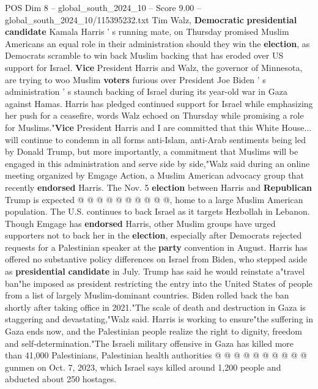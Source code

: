 \begin{textsample}{POS Dim 8 – global\_south\_2024\_10 – Score 9.00 – global\_south\_2024\_10/115395232.txt}  \label{ex:f8_pos_266}
Tim Walz, \textbf{Democratic} \textbf{presidential} \textbf{candidate} Kamala Harris ' s running mate, on Thursday promised Muslim Americans an equal role in their administration should they win the \textbf{election}, as Democrats scramble to win back Muslim backing that has eroded over US support for Israel. \textbf{Vice} President Harris and Walz, the governor of Minnesota, are trying to woo Muslim \textbf{voters} furious over President Joe Biden ' s administration ' s staunch backing of Israel during its year-old war in Gaza against Hamas.
Harris has pledged continued support for Israel while emphasizing her push for a ceasefire, words Walz echoed on Thursday while promising a role for Muslims."\textbf{Vice} President Harris and I are committed that this White House... will continue to condemn in all forms anti-Islam, anti-Arab sentiments being led by Donald Trump, but more importantly, a commitment that Muslims will be engaged in this administration and serve side by side,"Walz said during an online meeting organized by Emgage Action, a Muslim American advocacy group that recently \textbf{endorsed} Harris.
The Nov. 5 \textbf{election} between Harris and \textbf{Republican} Trump is expected @ @ @ @ @ @ @ @ @ @, home to a large Muslim American population.
The U.S. continues to back Israel as it targets Hezbollah in Lebanon.
Though Emgage has \textbf{endorsed} Harris, other Muslim groups have urged supporters not to back her in the \textbf{election}, especially after Democrats rejected requests for a Palestinian speaker at the \textbf{party} convention in August.
Harris has offered no substantive policy differences on Israel from Biden, who stepped aside as \textbf{presidential} \textbf{candidate} in July.
Trump has said he would reinstate a"travel ban"he imposed as president restricting the entry into the United States of people from a list of largely Muslim-dominant countries.
Biden rolled back the ban shortly after taking office in 2021."The scale of death and destruction in Gaza is staggering and devastating,"Walz said.
Harris is working to ensure"the suffering in Gaza ends now, and the Palestinian people realize the right to dignity, freedom and self-determination."The Israeli military offensive in Gaza has killed more than 41,000 Palestinians, Palestinian health authorities @ @ @ @ @ @ @ @ @ @ gunmen on Oct. 7, 2023, which Israel says killed around 1,200 people and abducted about 250 hostages.

\end{textsample}
